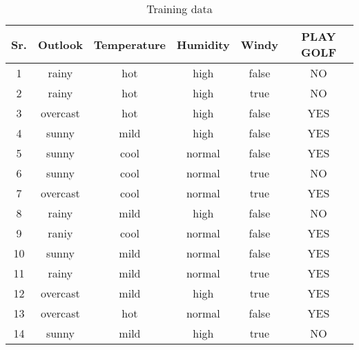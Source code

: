 \documentclass[11pt, a4paper]{article}
\begin{document}
\begin{table}[h!]
	\centering
	\caption{Training data}
	\label{tab:table1}
	\begin{tabular}{c|cccc|c}
		\toprule
		\textbf{Sr.} & \textbf{Outlook} & \textbf{Temperature} & \textbf{Humidity} & \textbf{Windy} & \textbf{PLAY GOLF} \\
		\midrule
		1            & rainy            & hot                  & high              & false          & NO                 \\
		2            & rainy            & hot                  & high              & true           & NO                 \\
		3            & overcast         & hot                  & high              & false          & YES                \\
		4            & sunny            & mild                 & high              & false          & YES                \\
		5            & sunny            & cool                 & normal            & false          & YES                \\
		6            & sunny            & cool                 & normal            & true           & NO                 \\
		7            & overcast         & cool                 & normal            & true           & YES                \\
		8            & rainy            & mild                 & high              & false          & NO                 \\
		9            & raniy            & cool                 & normal            & false          & YES                \\
		10           & sunny            & mild                 & normal            & false          & YES                \\
		11           & rainy            & mild                 & normal            & true           & YES                \\
		12           & overcast         & mild                 & high              & true           & YES                \\
		13           & overcast         & hot                  & normal            & false          & YES                \\
		14           & sunny            & mild                 & high              & true           & NO                 \\
		\bottomrule
	\end{tabular}
\end{table}
\end{document}
